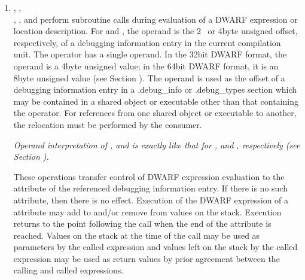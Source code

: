 \begin{enumerate}[1]
\item {}, ,  \\
, , and  perform
subroutine calls during evaluation of a DWARF expression or
location description. 
For  and 
, 
the
operand is the 2\dash~ or 4\dash byte 
unsigned offset, respectively,
of a debugging information entry in the current compilation
unit. The  operator has a single operand. In the
32\dash bit DWARF format, the operand is a 4\dash byte unsigned value;
in the 64\dash bit DWARF format, it is an 8\dash byte unsigned value
(see Section ). 
The operand is used as the offset of a
debugging information entry in a .debug\_info or .debug\_types
section which may be contained in a shared object or executable
other than that containing the operator. For references from
one shared object or executable to another, the relocation
must be performed by the consumer.  

\textit{Operand interpretation of
,  and  is exactly like
that for ,  and ,
respectively  
(see Section  ).  
}

These operations transfer
control of DWARF expression evaluation to the 
attribute of the referenced debugging information entry. If
there is no such attribute, then there is no effect. Execution
of the DWARF expression of a  attribute may add
to and/or remove from values on the stack. Execution returns
to the point following the call when the end of the attribute
is reached. Values on the stack at the time of the call may be
used as parameters by the called expression and values left on
the stack by the called expression may be used as return values
by prior agreement between the calling and called expressions.
\end{enumerate}


